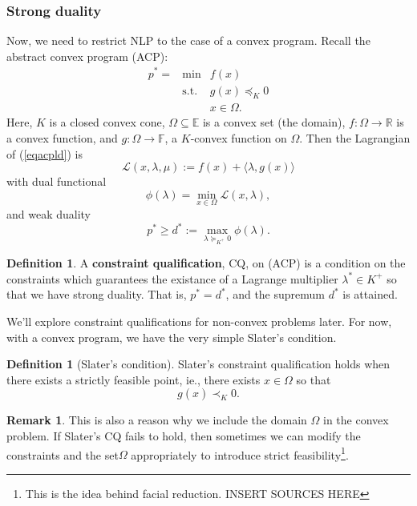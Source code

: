 \documentclass[11pt]{article}
\numberwithin{equation}{section}
\theoremstyle{definition}
\newtheorem{definition}[theorem]{Definition}%
\newtheorem{remark}[theorem]{Remark}
\newcommand{\bE}{\mathbb{E}}
\newcommand{\bF}{\mathbb{F}}
\newcommand{\bR}{\mathbb{R}}
\newcommand{\cL}{\mathcal{L}}
\newcommand{\tst}{\text{s.t.}}
\begin{document}
\subsubsection{Strong duality}
Now, we need to restrict NLP to the case of a convex program. Recall the abstract convex program (ACP):
\begin{equation}
    \label{eqacpld}
    \begin{array}{ccc}
         p^*=&\min & f(x)  \\
         &\tst & g(x)\preceq_K 0\\
           &   & x\in\Omega.
    \end{array}
\end{equation}
Here, $K$ is a closed convex cone, $\Omega\subseteq\bE$ is a convex set (the domain), $f:\Omega\to\bR$ is a convex function, and $g:\Omega\to\bF$, a $K$-convex function on $\Omega$. Then the Lagrangian of (\ref{eqacpld}) is
\begin{equation}
    \cL(x,\lambda,\mu):=f(x)+\langle \lambda, g(x)\rangle
\end{equation}
with dual functional 
\begin{equation}
    \phi(\lambda)=\min_{x\in\Omega}\cL(x,\lambda),
\end{equation}
and weak duality
\begin{equation}
    p^*\ge d^*:=\max_{\lambda\succeq_{K^+}0}\phi(\lambda).
\end{equation}
\begin{definition}
    A \textbf{constraint qualification}, CQ, on (ACP) is a condition on the constraints which guarantees the existance of a Lagrange multiplier $\lambda^*\in K^+$ so that we have strong duality. That is, $p^*=d^*$, and the supremum $d^*$ is attained.
\end{definition}
We'll explore constraint qualifications for non-convex problems later. For now, with a convex program, we have the very simple Slater's condition.
\begin{definition}[Slater's condition]
    Slater's constraint qualification holds when there exists a strictly feasible point, ie., there exists $\widehat x\in\Omega$ so that \begin{equation}
        g(\widehat x)\prec_K0.
    \end{equation}
\end{definition}
\begin{remark}
    This is also a reason why we include the domain $\Omega$ in the convex problem. If Slater's CQ fails to hold, then sometimes we can modify the constraints and the set$\Omega$ appropriately to introduce strict feasibility\footnote{This is the idea behind facial reduction. INSERT SOURCES HERE}.
\end{remark}
\end{document}
